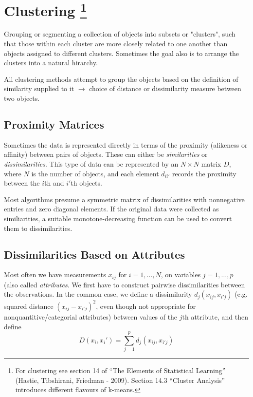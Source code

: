 
\section*{Clustering \footnote{For clustering see section 14 of ``The Elements of Statistical Learning'' (Hastie, Tibshirani, Friedman - 2009). Section 14.3 ``Cluster Analysis'' introduces different flavours of k-means. }}
Grouping or segmenting a collection of objects into subsets or "clusters", such that those within each cluster are more closely related to one another than objects assigned to different clusters. Sometimes the goal also is to arrange the clusters into a natural hirarchy.

All clustering methods attempt to group the objects based on the definition of similarity supplied to it \(\rightarrow\) choice of distance or dissimilarity measure between two objects.

\subsection*{Proximity Matrices}
Sometimes the data is represented directly in terms of the proximity (alikeness or affinity) between pairs of objects. These can either be \textit{similarities} or \textit{dissimilarities}. This type of data can be represented by an \(N \times N\) matrix \(D\), where \(N\) is the number of objects, and each element \(d_{ii'}\) records the proximity between the \(i\)th and \(i'\)th objects.

Most algorithms presume a symmetric matrix of dissimilarities with nonnegative entries and zero diagonal elements. If the original data were collected as similiarities, a suitable monotone-decreasing function can be used to convert them to dissimilarities.

\subsection*{Dissimilarities Based on Attributes}
Most often we have measurements \(x_{ij}\) for \(i = 1, \dots, N\), on variables \(j=1,\dots, p\) (also called \textit{attributes}. We first have to construct pairwise dissimilarities between the observations. In the common case, we define a dissimilarity \(d_j(x_{ij}, x_{i'j})\) (e.g. squared distance \((x_{ij} - x_{i'j})^2\), even though not appropriate for nonquantitive/categorial attributes) between values of the \(j\)th attribute, and then define
\[D(x_i, x_i') = \sum_{j=1}^p d_j(x_{ij}, x_{i'j})\]

